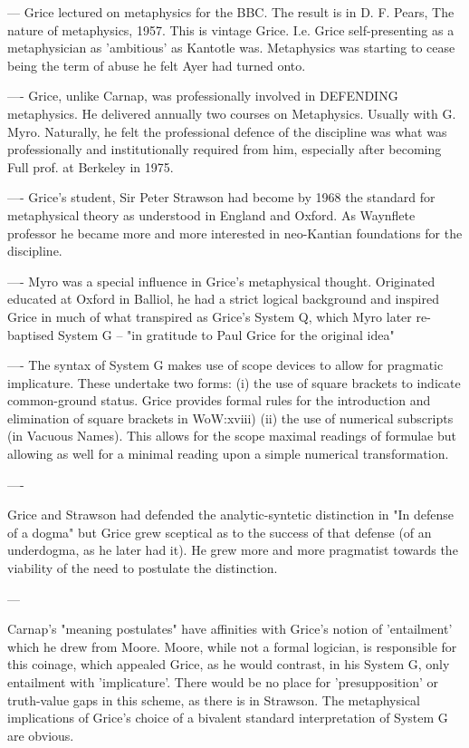 \documentclass[10pt,titlepage]{book}
\begin{document}
--- Grice lectured on metaphysics for the BBC. The result is in D. F.  
Pears, The nature of metaphysics, 1957. This is vintage Grice. I.e. Grice  
self-presenting as a metaphysician as 'ambitious' as Kantotle was. Metaphysics  
was starting to cease being the term of abuse he felt Ayer had turned  onto.

 
 
---- Grice, unlike Carnap, was professionally involved in DEFENDING  
metaphysics. He delivered annually two courses on Metaphysics. Usually with G.  
Myro. Naturally, he felt the professional defence of the discipline was what 
was  professionally and institutionally required from him, especially after 
becoming  Full prof. at Berkeley in 1975. 
 
---- Grice's student, Sir Peter Strawson had become by 1968 the standard  
for metaphysical theory as understood in England and Oxford. As Waynflete  
professor he became more and more interested in neo-Kantian foundations for 
the  discipline.
 
---- Myro was a special influence in Grice's metaphysical thought.  
Originated educated at Oxford in Balliol, he had a strict logical background and  
inspired Grice in much of what transpired as Grice's System Q, which Myro 
later  re-baptised System G -- "in gratitude to Paul Grice for the original 
idea"
 
---- The syntax of System G makes use of scope devices to allow for  
pragmatic implicature. These undertake two forms:
(i) the use of square brackets to indicate common-ground status. Grice  
provides formal rules for the introduction and elimination of square brackets 
in  WoW:xviii)
(ii) the use of numerical subscripts (in Vacuous Names). This allows for  
the scope maximal readings of formulae but allowing as well for a minimal  
reading upon a simple numerical transformation. 
 
----
 
Grice and Strawson had defended the analytic-syntetic distinction in "In  
defense of a dogma" but Grice grew sceptical as to the success of that 
defense  (of an underdogma, as he later had it). He grew more and more pragmatist 
towards  the viability of the need to postulate the distinction.
 
---
 
Carnap's "meaning postulates" have affinities with Grice's notion of  
'entailment' which he drew from Moore. Moore, while not a formal logician, is  
responsible for this coinage, which appealed Grice, as he would contrast, in 
his  System G, only entailment with 'implicature'. There would be no place 
for  'presupposition' or truth-value gaps in this scheme, as there is in 
Strawson.  The metaphysical implications of Grice's choice of a bivalent standard 
 interpretation of System G are obvious.
 
\end{document}
